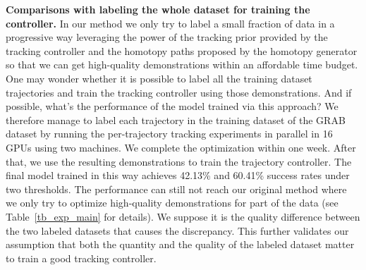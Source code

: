 \noindent\textbf{Comparisons with labeling the whole dataset for training the controller. } In our method we only try to label a small fraction of data in a progressive way leveraging the power of the tracking prior provided by the tracking controller and the homotopy paths proposed by the homotopy generator so 
that we can get high-quality demonstrations within an affordable time budget. One may wonder whether it is possible to label all the training dataset trajectories and train the tracking controller using those demonstrations. And if possible, what's the performance of the model trained via this approach? We therefore manage to label each trajectory in the training dataset of the GRAB dataset by running the per-trajectory tracking experiments in parallel in 16 GPUs using two machines. 
We complete the optimization within one week. 
After that, we use the resulting demonstrations to train 
the trajectory controller. The final model trained in this way achieves 42.13\% and 60.41\% success rates under two thresholds. The performance can still not reach our original method where we only try to optimize high-quality demonstrations for part of the data (see Table~\ref{tb_exp_main} for details). We suppose it is the quality difference between the two labeled datasets that causes the discrepancy. This further validates our assumption that both the quantity and the quality of the labeled dataset matter to train a good tracking controller. 




